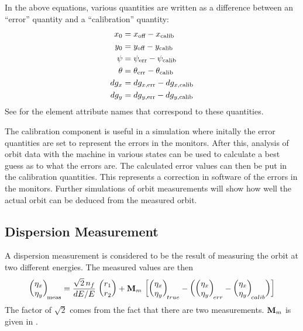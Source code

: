 In the above equations, various quantities are written as a difference between an ``error'' quantity
and a ``calibration'' quantity:
\begin{alignat}{1}
  x_0     &= x_{\text{off}} - x_{\text{calib}} \nonumber \\
  y_0     &= y_{\text{off}} - y_{\text{calib}} \nonumber \\
  \psi    &= \psi_{\text{err}}   - \psi_{\text{calib}} \nonumber \\
  \theta  &= \theta_{\text{err}} - \theta_{\text{calib}} \\
  dg_x    &= dg_{x,\text{err}} - dg_{x,\text{calib}} \nonumber \\
  dg_y    &= dg_{y,\text{err}} - dg_{y,\text{calib}} \nonumber
\end{alignat}
See  for the element attribute names that correspond to these quantities.

The calibration component is useful in a simulation where initally the error quantities are set to
represent the errors in the monitors. After this, analysis of orbit data with the machine in various
states can be used to calculate a best guess as to what the errors are. The calculated error values
can then be put in the calibration quantities. This represents a correction in software of the
errors in the monitors. Further simulations of orbit measurements will show how well the actual orbit
can be deduced from the measured orbit.

\subsection{Dispersion Measurement}
\label{Dispersion!measurement}

A dispersion measurement is considered to be the result of measuring the orbit at two different
energies. The measured values are then
\begin{equation}
  \begin{pmatrix}
    \eta_x \\ \eta_y
  \end{pmatrix}_{\! \text{meas}}
  =
  \frac{\sqrt{2} \, n_f}{dE/E} \, 
  \begin{pmatrix}
    r_1 \\ r_2
  \end{pmatrix}
  +
  {\bf M}_m \, \left[
  \begin{pmatrix}
    \eta_x \\ \eta_y
  \end{pmatrix}_{\! true}
  -
  \left(
  \begin{pmatrix}
    \eta_x \\ \eta_y
  \end{pmatrix}_{\! err}
  -
  \begin{pmatrix}
    \eta_x \\ \eta_y
  \end{pmatrix}_{\! calib}
  \right)
  \right]
\end{equation}
The factor of $\sqrt{2}$ comes from the fact that there are two measurements. ${\bf M}_m$ is given in .

